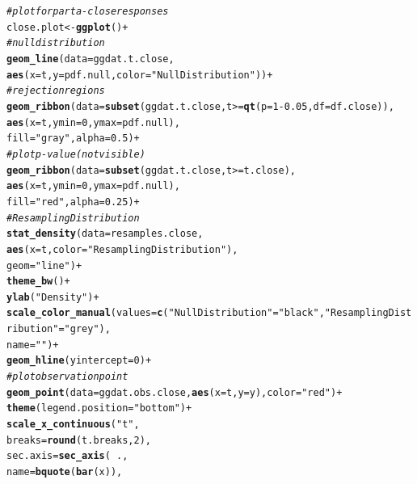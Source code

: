 \documentclass{article}\usepackage[]{graphicx}\usepackage[]{xcolor}
\makeatletter
\newcommand{\hlnum}[1]{\textcolor[rgb]{0.686,0.059,0.569}{#1}}%
\newcommand{\hlsng}[1]{\textcolor[rgb]{0.192,0.494,0.8}{#1}}%
\newcommand{\hlcom}[1]{\textcolor[rgb]{0.678,0.584,0.686}{\textit{#1}}}%
\newcommand{\hlopt}[1]{\textcolor[rgb]{0,0,0}{#1}}%
\newcommand{\hldef}[1]{\textcolor[rgb]{0.345,0.345,0.345}{#1}}%
\newcommand{\hlkwb}[1]{\textcolor[rgb]{0.69,0.353,0.396}{#1}}%
\newcommand{\hlkwc}[1]{\textcolor[rgb]{0.333,0.667,0.333}{#1}}%
\newcommand{\hlkwd}[1]{\textcolor[rgb]{0.737,0.353,0.396}{\textbf{#1}}}%
\newenvironment{kframe}{%
 \def\at@end@of@kframe{}%
 \ifinner\ifhmode%
  \def\at@end@of@kframe{\end{minipage}}%
  \begin{minipage}{\columnwidth}%
 \fi\fi%
 \def\FrameCommand##1{\hskip\@totalleftmargin \hskip-\fboxsep
 \colorbox{shadecolor}{##1}\hskip-\fboxsep
     \hskip-\linewidth \hskip-\@totalleftmargin \hskip\columnwidth}%
 \MakeFramed {\advance\hsize-\width
   \@totalleftmargin\z@ \linewidth\hsize
   \@setminipage}}%
 {\par\unskip\endMakeFramed%
 \at@end@of@kframe}
\newenvironment{knitrout}{}{} %
\makeatother
\begin{document}
\begin{enumerate}
\begin{enumerate}
\begin{knitrout}
\begin{kframe}
\begin{alltt}
\hlcom{#plot for part a - close responses}
\hldef{close.plot} \hlkwb{<-} \hlkwd{ggplot}\hldef{()} \hlopt{+}
\hlcom{# null distribution}
\hlkwd{geom_line}\hldef{(}\hlkwc{data}\hldef{=ggdat.t.close,}
          \hlkwd{aes}\hldef{(}\hlkwc{x}\hldef{=t,} \hlkwc{y}\hldef{=pdf.null,} \hlkwc{color} \hldef{=} \hlsng{"Null Distribution"}\hldef{))}\hlopt{+}
\hlcom{# rejection regions}
\hlkwd{geom_ribbon}\hldef{(}\hlkwc{data}\hldef{=}\hlkwd{subset}\hldef{(ggdat.t.close, t}\hlopt{>=}\hlkwd{qt}\hldef{(}\hlkwc{p} \hldef{=} \hlnum{1}\hlopt{-}\hlnum{0.05}\hldef{,} \hlkwc{df}\hldef{=df.close)),}
            \hlkwd{aes}\hldef{(}\hlkwc{x}\hldef{=t,} \hlkwc{ymin}\hldef{=}\hlnum{0}\hldef{,} \hlkwc{ymax}\hldef{=pdf.null),}
            \hlkwc{fill}\hldef{=}\hlsng{"gray"}\hldef{,} \hlkwc{alpha}\hldef{=}\hlnum{0.5}\hldef{)}\hlopt{+}
\hlcom{# plot p-value (not visible)}
\hlkwd{geom_ribbon}\hldef{(}\hlkwc{data}\hldef{=}\hlkwd{subset}\hldef{(ggdat.t.close, t}\hlopt{>=}\hldef{t.close),}
            \hlkwd{aes}\hldef{(}\hlkwc{x}\hldef{=t,} \hlkwc{ymin}\hldef{=}\hlnum{0}\hldef{,} \hlkwc{ymax}\hldef{=pdf.null),}
            \hlkwc{fill}\hldef{=}\hlsng{"red"}\hldef{,} \hlkwc{alpha}\hldef{=}\hlnum{0.25}\hldef{)}\hlopt{+}
\hlcom{# Resampling Distribution}
\hlkwd{stat_density}\hldef{(}\hlkwc{data}\hldef{=resamples.close,}
             \hlkwd{aes}\hldef{(}\hlkwc{x}\hldef{=t,} \hlkwc{color}\hldef{=}\hlsng{"Resampling Distribution"}\hldef{),}
             \hlkwc{geom}\hldef{=}\hlsng{"line"}\hldef{)}\hlopt{+}
\hlkwd{theme_bw}\hldef{()}\hlopt{+}
\hlkwd{ylab}\hldef{(}\hlsng{"Density"}\hldef{)}\hlopt{+}
\hlkwd{scale_color_manual}\hldef{(}\hlkwc{values} \hldef{=} \hlkwd{c}\hldef{(}\hlsng{"Null Distribution"} \hldef{=} \hlsng{"black"}\hldef{,} \hlsng{"Resampling Distribution"} \hldef{=} \hlsng{"grey"}\hldef{),}
                   \hlkwc{name} \hldef{=} \hlsng{""}\hldef{)} \hlopt{+}
\hlkwd{geom_hline}\hldef{(}\hlkwc{yintercept}\hldef{=}\hlnum{0}\hldef{)}\hlopt{+}
\hlcom{# plot observation point}
\hlkwd{geom_point}\hldef{(}\hlkwc{data}\hldef{=ggdat.obs.close,} \hlkwd{aes}\hldef{(}\hlkwc{x}\hldef{=t,} \hlkwc{y}\hldef{=y),} \hlkwc{color}\hldef{=}\hlsng{"red"}\hldef{)}\hlopt{+}
\hlkwd{theme}\hldef{(}\hlkwc{legend.position} \hldef{=} \hlsng{"bottom"}\hldef{)}\hlopt{+}
\hlkwd{scale_x_continuous}\hldef{(}\hlsng{"t"}\hldef{,}
                   \hlkwc{breaks} \hldef{=} \hlkwd{round}\hldef{(t.breaks,}\hlnum{2}\hldef{),}
                   \hlkwc{sec.axis} \hldef{=} \hlkwd{sec_axis}\hldef{(}\hlopt{~}\hldef{.,}
                                       \hlkwc{name} \hldef{=} \hlkwd{bquote}\hldef{(}\hlkwd{bar}\hldef{(x)),}

\end{alltt}
\end{kframe}
\end{knitrout}
\end{enumerate}
\end{enumerate}
\end{document}
